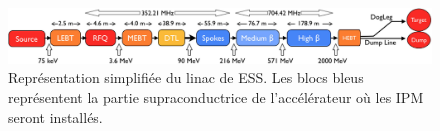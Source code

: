 \begin{figure}[!ht]
	\begin{center}
		\includegraphics[width=\textwidth]{00_French/figures/fig000_ESS_acc}
	\end{center}
	\caption[]{Représentation simplifiée du linac de ESS. Les blocs bleus représentent la partie supraconductrice de l'accélérateur où les IPM seront installés.}
	\label{sumfr:fig:ESS_acc}
\end{figure}
